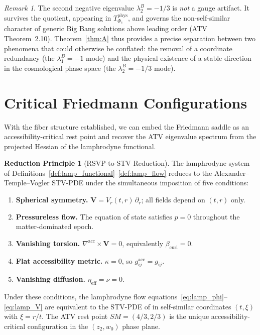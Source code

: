 \documentclass[12pt,a4paper]{article}
\theoremstyle{plain}
\theoremstyle{definition}
\newtheorem{principle}[theorem]{Reduction Principle}
\theoremstyle{remark}
\newtheorem{remark}[theorem]{Remark}
\newcommand{\Phic}{\Phi_c}
\newcommand{\nabacc}{\nabla^{\!\mathrm{acc}}}
\newcommand{\SM}{\mathit{SM}}
\newcommand{\etaeff}{\eta_{\mathrm{eff}}}
\newcommand{\bcurl}{\beta_{\mathrm{curl}}}
\newcommand{\lBn}[1]{\lambda^B_{#1}}
\begin{document}
\begin{remark}
The second negative eigenvalue $\lBn{2} = -1/3$ is \emph{not} a gauge artifact.
It survives the quotient, appearing in $T^{\mathrm{phys}}_{\Phic}$, and governs
the non-self-similar character of generic Big Bang solutions above leading order
(ATV Theorem~2.10). Theorem~\ref{thm:A} thus provides a precise separation
between two phenomena that could otherwise be conflated: the removal of a
coordinate redundancy (the $\lBn{1} = -1$ mode) and the physical existence of
a stable direction in the cosmological phase space (the $\lBn{2} = -1/3$ mode).
\end{remark}

\section{Critical Friedmann Configurations}
\label{sec:friedmann}

With the fiber structure established, we can embed the Friedmann saddle as an
accessibility-critical rest point and recover the ATV eigenvalue spectrum from
the projected Hessian of the lamphrodyne functional.

\begin{principle}[RSVP-to-STV Reduction]
\label{prin:reduction}
The lamphrodyne system of Definitions~\ref{def:lamp_functional}--\ref{def:lamp_flow}
reduces to the Alexander--Temple--Vogler STV-PDE under the simultaneous imposition
of five conditions:
\begin{enumerate}[label=\textup{(RP\arabic*)}]
  \item \textbf{Spherical symmetry.} $\mathbf{V} = V_r(t,r)\,\partial_r$; all
    fields depend on $(t,r)$ only.
  \item \textbf{Pressureless flow.} The equation of state satisfies $p = 0$
    throughout the matter-dominated epoch.
  \item \textbf{Vanishing torsion.} $\nabacc\times\mathbf{V} = 0$, equivalently
    $\bcurl = 0$.
  \item \textbf{Flat accessibility metric.} $\kappa = 0$, so
    $g^{\mathrm{acc}}_{ij} = g_{ij}$.
  \item \textbf{Vanishing diffusion.} $\etaeff = \nu = 0$.
\end{enumerate}
Under these conditions, the lamphrodyne flow equations~\eqref{eq:lamp_phi}--\eqref{eq:lamp_V}
are equivalent to the STV-PDE of \cite{STV2017} in self-similar coordinates
$(t,\xi)$ with $\xi = r/t$. The ATV rest point $\SM = (4/3, 2/3)$ is the unique
accessibility-critical configuration in the $(z_2,w_0)$ phase plane.
\end{principle}
\end{document}
